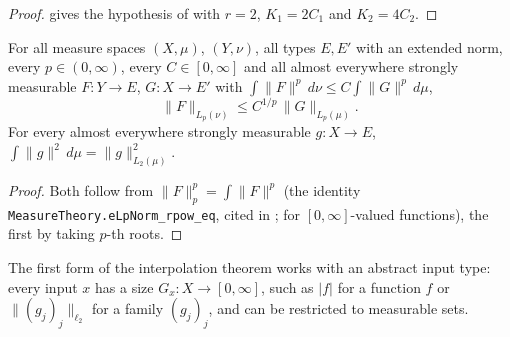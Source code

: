 \begin{proof}
\leanok
{} gives the hypothesis of 
with $r = 2$, $K_1 = 2 C_1$ and $K_2 = 4 C_2$.
\end{proof}

\begin{lemma}
\label{lem:lp-norm-from-power-integrals}
\leanok
{}
For all measure spaces $(X, \mu)$, $(Y, \nu)$, all types $E, E'$ with an extended norm, every
$p \in (0, \infty)$, every $C \in [0, \infty]$ and all almost everywhere strongly measurable
$F : Y \to E$, $G : X \to E'$ with $\int \|F\|^p \, d\nu \leq C \int \|G\|^p \, d\mu$,
\[
  \|F\|_{L_p(\nu)} \leq C^{1/p} \, \|G\|_{L_p(\mu)} .
\]
For every almost everywhere strongly measurable $g : X \to E$,
$\int \|g\|^2 \, d\mu = \|g\|_{L_2(\mu)}^2$.
\end{lemma}

\begin{proof}
\leanok
Both follow from $\|F\|_p^p = \int \|F\|^p$ (the identity
\texttt{MeasureTheory.\allowbreak eLpNorm\_\allowbreak rpow\_\allowbreak eq}, cited in
;  for $[0, \infty]$-valued functions),
the first by taking $p$-th roots.
\end{proof}

The first form of the interpolation theorem works with an abstract input type: every input
$x$ has a size $G_x : X \to [0, \infty]$, such as $|f|$ for a function $f$ or
$\|(g_j)_j\|_{\ell_2}$ for a family $(g_j)_j$, and can be restricted to measurable sets.


